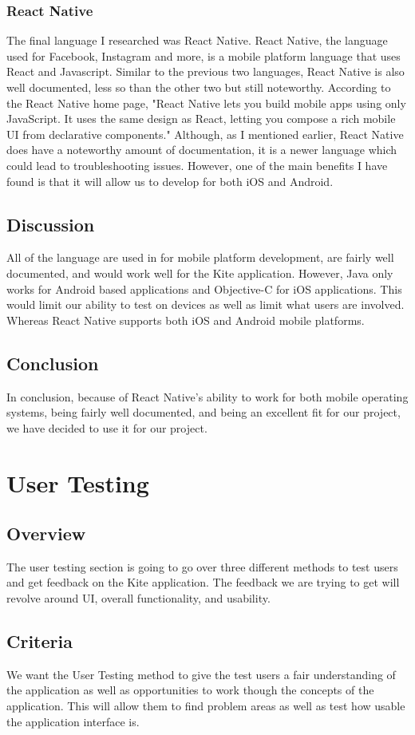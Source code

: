 \documentclass[compsoc, 10, draftclsnofoot, onecolumn]{IEEEtran}
\begin{document}
\subsubsection{React Native}
\indent The final language I researched was React Native. React Native, the language used for Facebook, Instagram and more, is a mobile platform language that uses React and Javascript. Similar to the previous two languages, React Native is also well documented, less so than the other two but still noteworthy. According to the React Native home page, "React Native lets you build mobile apps using only JavaScript. It uses the same design as React, letting you compose a rich mobile UI from declarative components\cite{r6}." Although, as I mentioned earlier, React Native does have a noteworthy amount of documentation, it is a newer language which could lead to troubleshooting issues. However, one of the main benefits I have found is that it will allow us to develop for both iOS and Android.  
\subsection{Discussion} All of the language are used in for mobile platform development, are fairly well documented, and would work well for the Kite application. However, Java only works for Android based applications and Objective-C for iOS applications. This would limit our ability to test on devices as well as limit what users are involved. Whereas React Native supports both iOS and Android mobile platforms.
\subsection{Conclusion}In conclusion, because of React Native's ability to work for both mobile operating systems, being fairly well documented, and being an excellent fit for our project, we have decided to use it for our project. 

\section{\textbf{User Testing}}
\subsection{Overview} The user testing section is going to go over three different methods to test users and get feedback on the Kite application. The feedback we are trying to get will revolve around UI, overall functionality, and usability. 
\subsection{Criteria} We want the User Testing method to give the test users a fair understanding of the application as well as opportunities to work though the concepts of the application. This will allow them to find problem areas as well as test how usable the application interface is.
\end{document}
